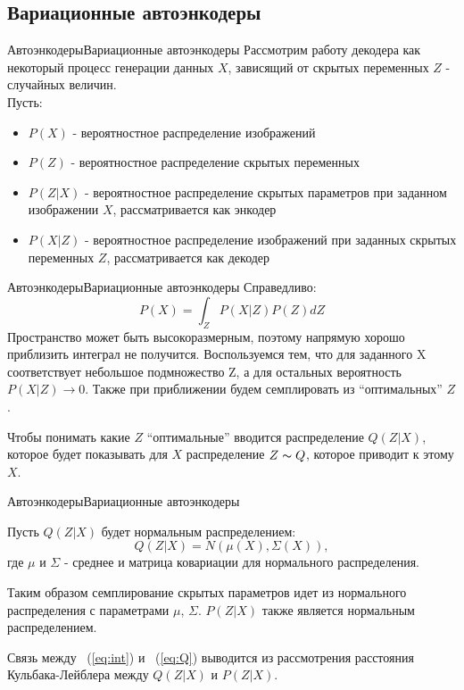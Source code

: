 \documentclass{beamer}
\begin{document}
\subsection{Вариационные автоэнкодеры}

\begin{frame}{Автоэнкодеры}{Вариационные автоэнкодеры}
Рассмотрим работу декодера как некоторый процесс генерации данных $X$, зависящий от скрытых переменных $Z$ - случайных величин.\\
Пусть:
\begin{itemize}
	\item $P(X)$ - вероятностное распределение изображений
	\item $P(Z)$ - вероятностное распределение скрытых переменных
	\item $P(Z|X)$ - вероятностное распределение скрытых параметров при заданном изображении $X$, рассматривается как энкодер
	\item $P(X|Z)$ - вероятностное распределение изображений при заданных скрытых переменных $Z$, рассматривается как декодер
\end{itemize}
\end{frame}

\begin{frame}{Автоэнкодеры}{Вариационные автоэнкодеры}
Справедливо:
\begin{equation}\label{eq:int}
P(X) = \int_{Z} P(X|Z)P(Z) dZ
\end{equation}
Пространство может быть высокоразмерным, поэтому напрямую хорошо приблизить интеграл не получится. Воспользуемся тем, что для заданного X соответствует небольшое подмножество Z, а для остальных вероятность $P(X|Z) \to 0$. Также при приближении будем семплировать из ``оптимальных'' $Z$. \par\medskip
Чтобы понимать какие $Z$ ``оптимальные'' вводится распределение $Q(Z|X)$, которое будет показывать для $X$ распределение $Z \thicksim Q$, которое приводит к этому $X$.
\end{frame}

\begin{frame}{Автоэнкодеры}{Вариационные автоэнкодеры}

Пусть $Q(Z|X)$ будет нормальным распределением:
\begin{equation}\label{eq:Q}
Q(Z|X) = N(\mu(X), \Sigma(X)),
\end{equation}
где $\mu$ и $\Sigma$ - среднее и матрица ковариации для нормального распределения. \par\medskip
Таким образом семплирование скрытых параметров идет из нормального распределения с параметрами $\mu$, $\Sigma$. $P(Z|X)$ также является нормальным распределением. \par\medskip
Связь между ~(\ref{eq:int}) и ~(\ref{eq:Q}) выводится из рассмотрения расстояния Кульбака-Лейблера между $Q(Z|X)$ и $P(Z|X)$.

\end{frame}
\end{document}
